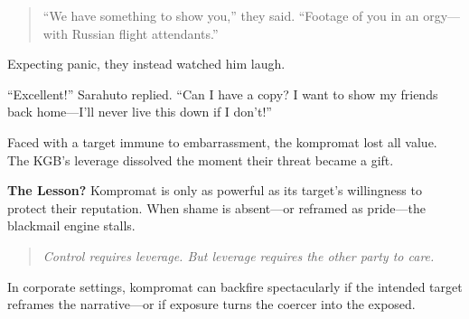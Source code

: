 \begin{tcolorbox}[colback=blue!5!white, colframe=blue!50!black, breakable, title={Historical Sidebar: Kompromat --- When Blackmail Becomes the Business Model}]
  \begin{quote}
  “We have something to show you,” they said. “Footage of you in an orgy—with Russian flight attendants.”
  \end{quote}
  
  Expecting panic, they instead watched him laugh.
  
  “Excellent!” Sarahuto replied. “Can I have a copy? I want to show my friends back home—I’ll never live this down if I don’t!”
  
  \medskip
  
  Faced with a target immune to embarrassment, the kompromat lost all value.  
  The KGB’s leverage dissolved the moment their threat became a gift.
  
  \medskip
  
  \textbf{The Lesson?}  
  Kompromat is only as powerful as its target’s willingness to protect their reputation.  
  When shame is absent—or reframed as pride—the blackmail engine stalls.
  
  \medskip
  
  \begin{quote}
  \textit{Control requires leverage. But leverage requires the other party to care.}
  \end{quote}
  
  In corporate settings, kompromat can backfire spectacularly if the intended target reframes the narrative—or if exposure turns the coercer into the exposed.
  
\end{tcolorbox}

